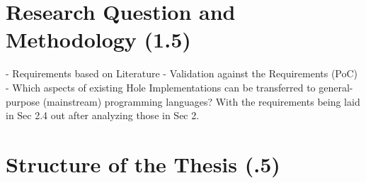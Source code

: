 \section{Research Question and Methodology (1.5)}
- Requirements based on Literature
- Validation against the Requirements (PoC)
- Which aspects of existing Hole Implementations can be transferred to general-purpose (mainstream) programming languages? With the requirements being laid in Sec 2.4 out after analyzing those in Sec 2.
\section{Structure of the Thesis (.5)}
